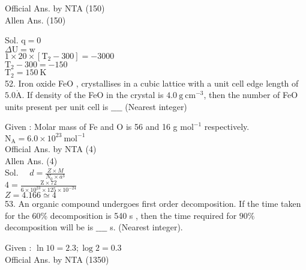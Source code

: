\documentclass[10pt]{article}
\def\AA{\mathring{\mathrm{A}}}
\begin{document}
Official Ans. by NTA (150)\\
Allen Ans. (150)

Sol. \(\mathrm{q}=0\)\\
\(\Delta \mathrm{U}=\mathrm{w}\)\\
\(1 \times 20 \times\left[\mathrm{T}_{2}-300\right]=-3000\)\\
\(\mathrm{T}_{2}-300=-150\)\\
\(\mathrm{T}_{2}=150 \mathrm{~K}\)\\
52. Iron oxide FeO , crystallises in a cubic lattice with a unit cell edge length of \(5.0 \AA\). If density of the FeO in the crystal is \(4.0 \mathrm{~g} \mathrm{~cm}^{-3}\), then the number of FeO units present per unit cell is \(\_\_\_\_\) (Nearest integer)

Given : Molar mass of Fe and O is 56 and 16 g \(\mathrm{mol}^{-1}\) respectively.\\
\(\mathrm{N}_{\mathrm{A}}=6.0 \times 10^{23} \mathrm{~mol}^{-1}\)\\
Official Ans. by NTA (4)\\
Allen Ans. (4)\\
Sol. \(\quad d=\frac{Z \times M}{N_{0} \times a^{3}}\)\\
\(4=\frac{\mathrm{Z} \times 72}{6 \times 10^{23} \times 125 \times 10^{-24}}\)\\
\(Z=4.166 \simeq 4\)\\
53. An organic compound undergoes first order decomposition. If the time taken for the 60\% decomposition is 540 s , then the time required for \(90 \%\) decomposition will be is \(\_\_\_\_\) s. (Nearest integer).

Given : \(\ln 10=2.3 ; \log 2=0.3\)\\
Official Ans. by NTA (1350)
\end{document}
